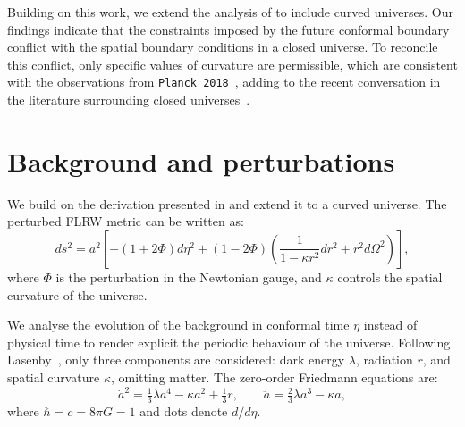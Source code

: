 \documentclass[%
 reprint,
 amsmath,amssymb,
 prl,
]{revtex4-2}
\begin{document}
Building on this work, we extend the analysis of \citet{2022PhRvD.105h3514L} to include curved universes. Our findings indicate that the constraints imposed by the future conformal boundary conflict with the spatial boundary conditions in a closed universe. To reconcile this conflict, only specific values of curvature are permissible, which are consistent with the observations from \texttt{Planck 2018}~\cite{2020A&A...641A...6P}, adding to the recent conversation in the literature surrounding closed universes~\cite{2020NatAs...4..196D, 2021PhRvD.103d1301H, 2022MNRAS.517.3087G, 2020MNRAS.496L..91E}.

\section{Background and perturbations} 
We build on the derivation presented in \citet{2022PhRvD.105h3514L} and extend it to a curved universe. The perturbed FLRW metric can be written as:
\begin{equation}
    ds^2 = a^2 \left[-(1 + 2\Phi)d\eta^2 + (1 - 2\Phi)\left(\frac{1}{1-\kappa r^2}dr^2+r^2d\Omega^2\right) \right],
\end{equation}
where \(\Phi\) is the perturbation in the Newtonian gauge, and $\kappa$ controls the spatial curvature of the universe.

We analyse the evolution of the background in conformal time \(\eta\) instead of physical time to render explicit the periodic behaviour of the universe. Following Lasenby~\cite{2022PhRvD.105h3514L}, only three components are considered: dark energy $\lambda$, radiation $r$, and spatial curvature $\kappa$, omitting matter. The zero-order Friedmann equations are: 
\begin{equation}\label{eq:friedmann_eq}
    \dot{a}^2 = \tfrac{1}{3}\lambda a^4 - \kappa a^2  + \tfrac{1}{3} r, \qquad 
    \ddot{a} = \tfrac{2}{3}\lambda a^3 - \kappa a,
\end{equation}
where \(\hbar = c = 8\pi G = 1\) and dots denote \(d/d\eta\).
\end{document}
